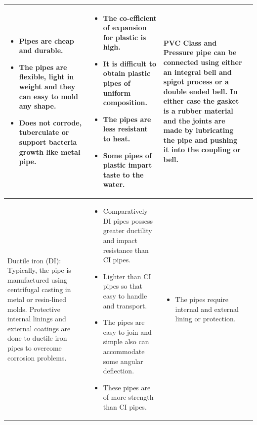 \documentclass{article}
\begin{document}
\begin{table}[h!]
\begin{tabular}{| m{5cm} | m{5cm} | m{5cm} | m{5cm}|}
{\begin{itemize}[leftmargin=*, topsep=5pt, partopsep=0pt]
  \item Pipes are cheap and durable.

\item The pipes are flexible, light in weight and they can easy to mold any shape.

\item Does not corrode, tuberculate or support bacteria growth like metal pipe.

  \end{itemize}}  
    &
  \scriptsize{\begin{itemize}[leftmargin=*, topsep=5pt, partopsep=0pt]
  \item The co-efficient of expansion for plastic is high.

\item It is difficult to obtain plastic pipes of uniform composition.

\item The pipes are less resistant to heat.

\item Some pipes of plastic impart taste to the water.
  \end{itemize}} 
  & \scriptsize{PVC Class and Pressure pipe can be connected using either an integral bell and spigot process or a double ended bell. In either case the gasket is a rubber material and the joints
are made by lubricating the pipe and pushing it into the coupling or bell.}
    \\ \hline
    
    
    
    \scriptsize{Ductile iron (DI): Typically, the pipe is manufactured using centrifugal casting in metal or resin-lined molds. Protective internal linings and external coatings are done to ductile iron pipes to overcome corrosion problems.}
&
  \scriptsize{\begin{itemize}[leftmargin=*, topsep=5pt, partopsep=0pt]
  \item Comparatively DI pipes possess greater ductility and impact resistance than CI pipes.

\item Lighter than CI pipes so that easy to handle and transport.

\item The pipes are easy to join and simple also can accommodate some angular deflection.

\item These pipes are of more strength than CI pipes.
  \end{itemize}}  
    &
  \scriptsize{\begin{itemize}[leftmargin=*, topsep=5pt, partopsep=0pt]
  \item The pipes require internal and external lining or protection.


\end{itemize}}
\end{tabular}
\end{table}
\end{document}
